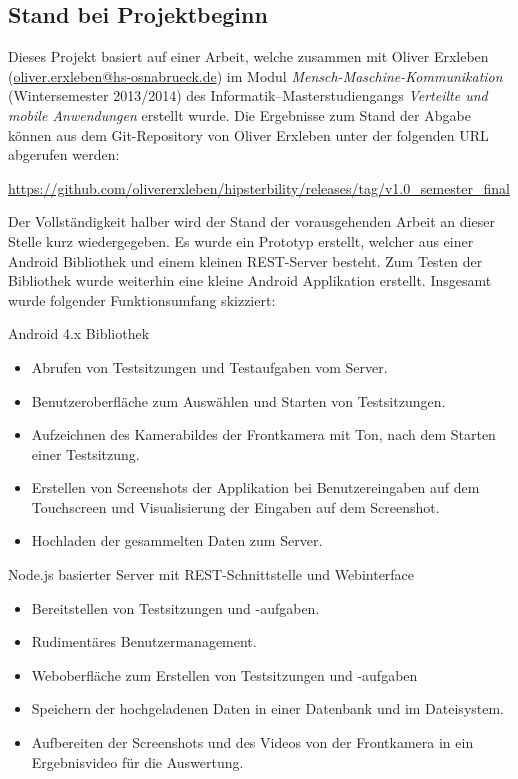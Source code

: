 \subsection{Stand bei Projektbeginn}
Dieses Projekt basiert auf einer Arbeit, welche zusammen mit Oliver Erxleben (\href{mailto:oliver.erxleben@hs-osnabrueck.de}{oliver.erxleben@hs-osnabrueck.de}) im Modul \emph{Mensch-Maschine-Kommunikation} (Wintersemester 2013/2014) des Informatik--Masterstudiengangs \emph{Verteilte und mobile Anwendungen} erstellt wurde.
Die Ergebnisse zum Stand der Abgabe können aus dem Git-Repository von Oliver Erxleben unter der folgenden \ac{URL} abgerufen werden:

\url{https://github.com/olivererxleben/hipsterbility/releases/tag/v1.0_semester_final}

Der Vollständigkeit halber wird der Stand der vorausgehenden Arbeit an dieser Stelle kurz wiedergegeben.
Es wurde ein Prototyp erstellt, welcher aus einer Android Bibliothek und einem kleinen \ac{REST}-Server besteht.
Zum Testen der Bibliothek wurde weiterhin eine kleine Android Applikation erstellt.
Insgesamt wurde folgender Funktionsumfang skizziert:
\begin{compactitem}
	\item Android 4.x Bibliothek
	\begin{itemize}
		\item Abrufen von Testsitzungen und Testaufgaben vom Server.
		\item Benutzeroberfläche zum Auswählen und Starten von Testsitzungen.
		\item Aufzeichnen des Kamerabildes der Frontkamera mit Ton, nach dem Starten einer Testsitzung.
		\item Erstellen von Screenshots der Applikation bei Benutzereingaben auf dem Touchscreen und Visualisierung der Eingaben auf dem Screenshot.
		\item Hochladen der gesammelten Daten zum Server.
	\end{itemize}
	\item Node.js basierter Server mit REST-Schnittstelle und Webinterface
	\begin{itemize}
		\item Bereitstellen von Testsitzungen und -aufgaben.
		\item Rudimentäres Benutzermanagement.
		\item Weboberfläche zum Erstellen von Testsitzungen und -aufgaben
		\item Speichern der hochgeladenen Daten in einer Datenbank und im Dateisystem.
		\item Aufbereiten der Screenshots und des Videos von der Frontkamera in ein Ergebnisvideo für die Auswertung.
	\end{itemize}
\end{compactitem}

